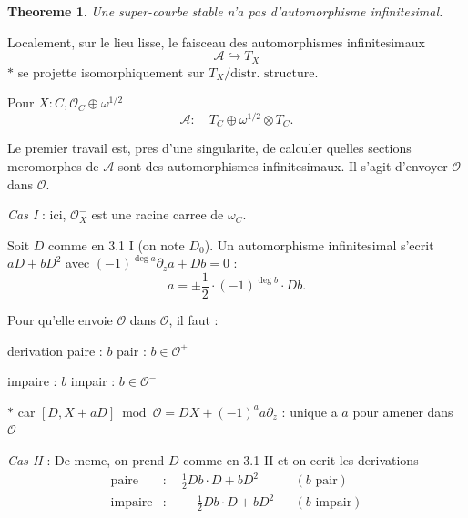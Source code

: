\documentclass[11pt,a4paper]{article}
\theoremstyle{plain}
\newtheorem{theorem}{Theoreme}
\theoremstyle{definition}
\begin{document}
\begin{theorem}
Une super-courbe stable n'a pas d'automorphisme infinitesimal.
\end{theorem}

Localement, sur le lieu lisse, le faisceau des automorphismes infinitesimaux
\[
\mathcal{A} \hookrightarrow T_X
\]
$*$ se projette isomorphiquement sur $T_X / \text{distr. structure}$.

Pour $X : C, \mathcal{O}_C \oplus \omega^{1/2}$
\[
\mathcal{A} : \quad T_C \oplus \omega^{1/2} \otimes T_C.
\]

Le premier travail est, pres d'une singularite, de calculer quelles sections meromorphes de $\mathcal{A}$ sont des automorphismes infinitesimaux. Il s'agit d'envoyer $\mathcal{O}$ dans $\mathcal{O}$.

\medskip

\noindent \textit{Cas I} : ici, $\mathcal{O}_X^-$ est une racine carree de $\omega_C$.

Soit $D$ comme en 3.1 I (on note $D_0$). Un automorphisme infinitesimal s'ecrit $aD + bD^2$ avec $(-1)^{\deg a} \partial_z a + Db = 0$ :
\[
a = \pm \frac{1}{2} \cdot (-1)^{\deg b} \cdot Db.
\]

Pour qu'elle envoie $\mathcal{O}$ dans $\mathcal{O}$, il faut :

\hspace{1cm} derivation paire : $b$ pair : $b \in \mathcal{O}^+$

\hspace{1cm} impaire : $b$ impair : $b \in \mathcal{O}^-$

\begin{center}
\end{center}

\vspace{0.5cm}

$*$ car $[D, X + aD] \bmod \mathcal{O} = DX + (-1)^a a\partial_z$ : unique a $a$ pour amener dans $\mathcal{O}$

\newpage

\noindent \textit{Cas II} : De meme, on prend $D$ comme en 3.1 II et on ecrit les derivations
\[
\begin{aligned}
\text{paire} &: \quad \tfrac{1}{2} Db \cdot D + bD^2 && (b \text{ pair}) \\
\text{impaire} &: \quad -\tfrac{1}{2} Db \cdot D + bD^2 && (b \text{ impair})
\end{aligned}
\]
\end{document}
